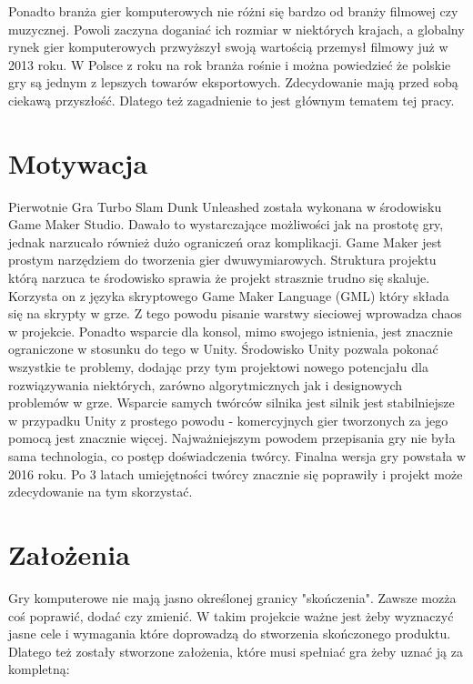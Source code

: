 \documentclass[a4paper,12pt,twoside,openany]{report}
\begin{document}
Ponadto branża gier komputerowych nie różni się bardzo od branży filmowej czy muzycznej. Powoli zaczyna doganiać ich rozmiar w niektórych krajach, a globalny rynek gier komputerowych przwyższył swoją wartością przemysł filmowy już w 2013 roku. W Polsce z roku na rok branża rośnie i można powiedzieć że polskie gry są jednym z lepszych towarów eksportowych. Zdecydowanie mają przed sobą ciekawą przyszłość. Dlatego też zagadnienie to jest głównym tematem tej pracy. 

\section{Motywacja}
Pierwotnie Gra Turbo Slam Dunk Unleashed została wykonana w środowisku Game Maker Studio. Dawało to wystarczające możliwości jak na prostotę gry, jednak narzucało również dużo ograniczeń oraz komplikacji. Game Maker jest prostym narzędziem do tworzenia gier dwuwymiarowych. Struktura projektu którą narzuca te środowisko sprawia że projekt strasznie trudno się skaluje. Korzysta on z języka skryptowego Game Maker Language (GML) który składa się na skrypty w grze. Z tego powodu pisanie warstwy sieciowej wprowadza chaos w projekcie. Ponadto wsparcie dla konsol, mimo swojego istnienia, jest znacznie ograniczone w stosunku do tego w Unity. Środowisko Unity pozwala pokonać wszystkie te problemy, dodając przy tym projektowi nowego potencjału dla rozwiązywania niektórych, zarówno algorytmicznych jak i designowych problemów w grze. Wsparcie samych twórców silnika jest silnik jest stabilniejsze w przypadku Unity z prostego powodu - komercyjnych gier tworzonych za jego pomocą jest znacznie więcej. Najważniejszym powodem przepisania gry nie była sama technologia, co postęp doświadczenia twórcy. Finalna wersja gry powstała w 2016 roku. Po 3 latach umiejętności twórcy znacznie się poprawiły i projekt może zdecydowanie na tym skorzystać. 

\section{Założenia}
Gry komputerowe nie mają jasno określonej granicy "skończenia". Zawsze mozża coś poprawić, dodać czy zmienić. W takim projekcie ważne jest żeby wyznaczyć jasne cele i wymagania które doprowadzą do stworzenia skończonego produktu. Dlatego też zostały stworzone założenia, które musi spełniać gra żeby uznać ją za kompletną:
\end{document}
